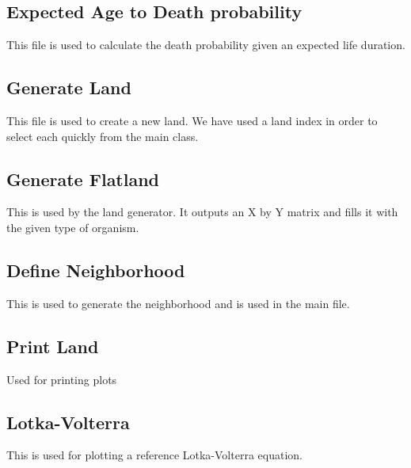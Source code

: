 \documentclass[11pt]{article}
\begin{document}
\subsection{Expected Age to Death probability}
This file is used to calculate the death probability given an expected life duration.

\subsection{Generate Land}
This file is used to create a new land. We have used a land index in order to select each quickly from the main class.

\subsection{Generate Flatland}
This is used by the land generator. It outputs an X by Y matrix and fills it with the given type of organism.

\subsection{Define Neighborhood}
This is used to generate the neighborhood and is used in the main file.

\subsection{Print Land}
Used for printing plots

\subsection{Lotka-Volterra}
This is used for plotting a reference Lotka-Volterra equation.





\end{document}
